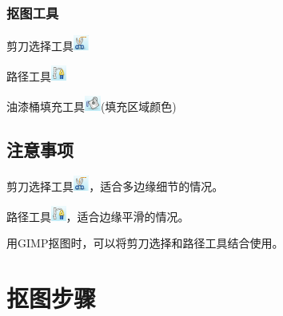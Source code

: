 \documentclass[12pt]{article}
\begin{document}
\subsubsection*{抠图工具}
\begin{itemize*}
\item 剪刀选择工具\includegraphics[height=0.2in]{jiandao.png}
\item 路径工具\includegraphics[height=0.2in]{lujing.png}
\item 油漆桶填充工具\includegraphics[height=0.2in]{youqitong1.png}(填充区域颜色)
\end{itemize*}

\subsection*{注意事项}
\begin{itemize*}
\item 剪刀选择工具\includegraphics[height=0.2in]{jiandao.png}，适合多边缘细节的情况。
\item 路径工具\includegraphics[height=0.2in]{lujing.png}，适合边缘平滑的情况。
\item 用GIMP抠图时，可以将剪刀选择和路径工具结合使用。
\end{itemize*}



\section{抠图步骤}
\end{document}
